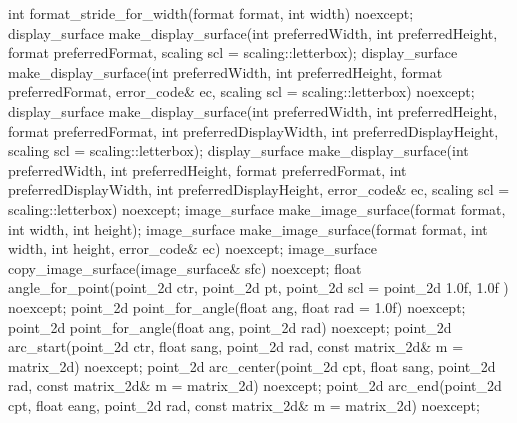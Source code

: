 \begin{codeblock}
{{{{  int format_stride_for_width(format format, int width) noexcept;
  display_surface make_display_surface(int preferredWidth,
    int preferredHeight, format preferredFormat,
    scaling scl = scaling::letterbox);
  display_surface make_display_surface(int preferredWidth,
    int preferredHeight, format preferredFormat, error_code& ec,
    scaling scl = scaling::letterbox) noexcept;
  display_surface make_display_surface(int preferredWidth,
    int preferredHeight, format preferredFormat, int preferredDisplayWidth, 
    int preferredDisplayHeight, scaling scl = scaling::letterbox);
  display_surface make_display_surface(int preferredWidth,
    int preferredHeight, format preferredFormat, int preferredDisplayWidth, 
    int preferredDisplayHeight, error_code& ec,
    scaling scl = scaling::letterbox) noexcept;
  image_surface make_image_surface(format format, int width, int height);
  image_surface make_image_surface(format format, int width, int height, 
    error_code& ec) noexcept;
  image_surface copy_image_surface(image_surface& sfc) noexcept;
  float angle_for_point(point_2d ctr, point_2d pt,
    point_2d scl = point_2d{ 1.0f, 1.0f }) noexcept;
  point_2d point_for_angle(float ang, float rad = 1.0f) noexcept;
  point_2d point_for_angle(float ang, point_2d rad) noexcept;
  point_2d arc_start(point_2d ctr, float sang, point_2d rad, 
    const matrix_2d& m = matrix_2d{}) noexcept;
  point_2d arc_center(point_2d cpt, float sang, point_2d rad, 
    const matrix_2d& m = matrix_2d{}) noexcept;
  point_2d arc_end(point_2d cpt, float eang, point_2d rad, 
    const matrix_2d& m = matrix_2d{}) noexcept;
} } } }

\end{codeblock}
%
